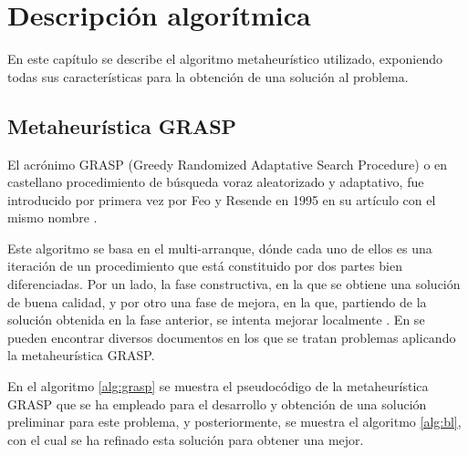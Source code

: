 
\chapter{Descripción algorítmica} %

\label{Chapter3}

En este capítulo se describe el algoritmo metaheurístico utilizado, exponiendo todas sus características para la obtención de una solución al problema.

\section{Metaheurística GRASP}
\label{sec_metaGrasp}
El acrónimo \gls{GRASP} (Greedy Randomized Adaptative Search Procedure) o en castellano procedimiento de búsqueda voraz aleatorizado y adaptativo, fue introducido por primera vez por Feo y Resende en 1995 en su artículo con el mismo nombre \cite{grasp-feo-resende}.

Este algoritmo se basa en el multi-arranque, dónde cada uno de ellos es una iteración de un procedimiento que está constituido por dos partes bien diferenciadas. Por un lado, la fase constructiva, en la que se obtiene una solución de buena calidad, y por otro una fase de mejora, en la que, partiendo de la solución obtenida en la fase anterior, se intenta mejorar localmente \cite{libro-metaheuristicas}. 
En \cite{grasp-flightrecoveryproblem} \cite{grasp-parallel} \cite{grasp-weapon} \cite{grasp-empaquetado} \cite{grasp-ruta} \cite{grasp-vertex} se pueden encontrar diversos documentos en los que se tratan problemas aplicando la metaheurística \gls{GRASP}.

En el algoritmo \ref{alg:grasp} se muestra el pseudocódigo de la metaheurística \gls{GRASP} que se ha empleado para el desarrollo y obtención de una solución preliminar para este problema, y posteriormente, se muestra el algoritmo \ref{alg:bl}, con el cual se ha refinado esta solución para obtener una mejor.\\

